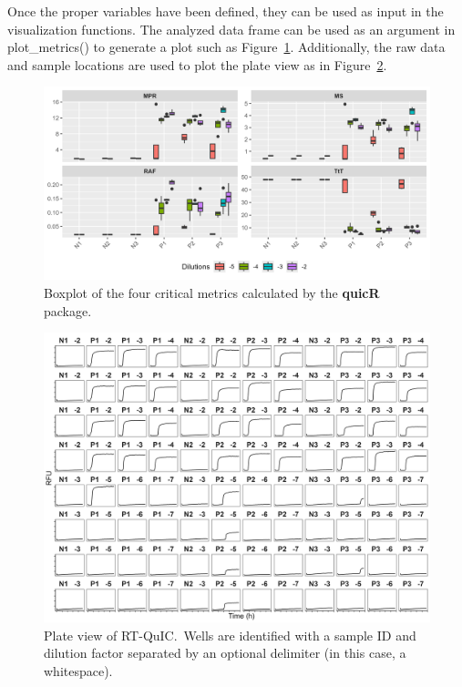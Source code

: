 \documentclass[preprint,12pt,a4paper]{elsarticle}
\begin{document}
            Once the proper variables have been defined, they can be used as input in the visualization functions. The analyzed data frame can be used as an argument in plot\_metrics() to generate a plot such as Figure~\ref{fig:boxplot}. Additionally, the raw data and sample locations are used to plot the plate view as in Figure~\ref{fig:plateview}.

            \begin{figure}[ht]
                \centering
                \includegraphics[width=\textwidth]{images/boxplot.png}
                \caption{Boxplot of the four critical metrics calculated by the \textbf{quicR} package.}\label{fig:boxplot}
            \end{figure}

            \begin{figure}[ht]
                \centering
                \includegraphics[width=\textwidth]{images/plate_view.png}
                \caption{Plate view of RT-QuIC.\ Wells are identified with a sample ID and dilution factor separated by an optional delimiter (in this case, a whitespace).}\label{fig:plateview}
            \end{figure}
            
\end{document}
